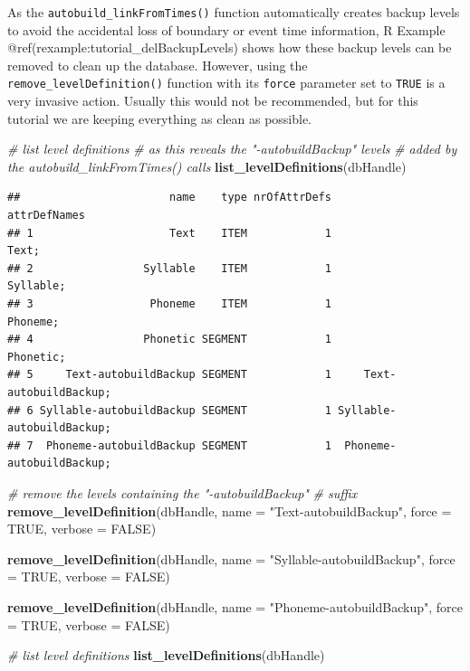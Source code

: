 \documentclass[]{book}
\newenvironment{Shaded}{\begin{snugshade}}{\end{snugshade}}
\newcommand{\KeywordTok}[1]{\textcolor[rgb]{0.13,0.29,0.53}{\textbf{{#1}}}}
\newcommand{\DataTypeTok}[1]{\textcolor[rgb]{0.13,0.29,0.53}{{#1}}}
\newcommand{\StringTok}[1]{\textcolor[rgb]{0.31,0.60,0.02}{{#1}}}
\newcommand{\CommentTok}[1]{\textcolor[rgb]{0.56,0.35,0.01}{\textit{{#1}}}}
\newcommand{\OtherTok}[1]{\textcolor[rgb]{0.56,0.35,0.01}{{#1}}}
\newcommand{\NormalTok}[1]{{#1}}
\theoremstyle{definition}
\theoremstyle{definition}
\theoremstyle{definition}
\theoremstyle{remark}
\begin{document}
As the \texttt{autobuild\_linkFromTimes()} function automatically
creates backup levels to avoid the accidental loss of boundary or event
time information, R Example @ref(rexample:tutorial\_delBackupLevels)
shows how these backup levels can be removed to clean up the database.
However, using the \texttt{remove\_levelDefinition()} function with its
\texttt{force} parameter set to \texttt{TRUE} is a very invasive action.
Usually this would not be recommended, but for this tutorial we are
keeping everything as clean as possible.

\begin{Shaded}
\begin{Highlighting}[]
\CommentTok{# list level definitions}
\CommentTok{# as this reveals the "-autobuildBackup" levels}
\CommentTok{# added by the autobuild_linkFromTimes() calls}
\KeywordTok{list_levelDefinitions}\NormalTok{(dbHandle)}
\end{Highlighting}
\end{Shaded}

\begin{verbatim}
##                       name    type nrOfAttrDefs              attrDefNames
## 1                     Text    ITEM            1                     Text;
## 2                 Syllable    ITEM            1                 Syllable;
## 3                  Phoneme    ITEM            1                  Phoneme;
## 4                 Phonetic SEGMENT            1                 Phonetic;
## 5     Text-autobuildBackup SEGMENT            1     Text-autobuildBackup;
## 6 Syllable-autobuildBackup SEGMENT            1 Syllable-autobuildBackup;
## 7  Phoneme-autobuildBackup SEGMENT            1  Phoneme-autobuildBackup;
\end{verbatim}

\begin{Shaded}
\begin{Highlighting}[]
\CommentTok{# remove the levels containing the "-autobuildBackup"}
\CommentTok{# suffix}
\KeywordTok{remove_levelDefinition}\NormalTok{(dbHandle,}
                       \DataTypeTok{name =} \StringTok{"Text-autobuildBackup"}\NormalTok{,}
                       \DataTypeTok{force =} \OtherTok{TRUE}\NormalTok{,}
                       \DataTypeTok{verbose =} \OtherTok{FALSE}\NormalTok{)}

\KeywordTok{remove_levelDefinition}\NormalTok{(dbHandle,}
                       \DataTypeTok{name =} \StringTok{"Syllable-autobuildBackup"}\NormalTok{,}
                       \DataTypeTok{force =} \OtherTok{TRUE}\NormalTok{,}
                       \DataTypeTok{verbose =} \OtherTok{FALSE}\NormalTok{)}

\KeywordTok{remove_levelDefinition}\NormalTok{(dbHandle,}
                       \DataTypeTok{name =} \StringTok{"Phoneme-autobuildBackup"}\NormalTok{,}
                       \DataTypeTok{force =} \OtherTok{TRUE}\NormalTok{,}
                       \DataTypeTok{verbose =} \OtherTok{FALSE}\NormalTok{)}

\CommentTok{# list level definitions}
\KeywordTok{list_levelDefinitions}\NormalTok{(dbHandle)}
\end{Highlighting}
\end{Shaded}
\end{document}

